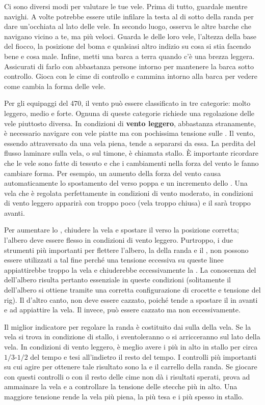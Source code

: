 Ci sono diversi modi per valutare le tue vele. Prima di tutto, guardale mentre
navighi. A volte potrebbe essere utile infilare la testa al di sotto della randa
per dare un'occhiata al lato \leeward delle vele. In secondo luogo, osserva le
altre barche che navigano vicino a te, ma più veloci. Guarda le \leeches delle
loro vele, l'altezza della base del fiocco, la posizione del boma e qualsiasi
altro indizio su cosa si stia facendo bene e cosa male. Infine, metti una barca
a terra quando c'è una brezza leggera. Assicurati di farlo con abbastanza
persone intorno per mantenere la barca sotto controllo. Gioca con le cime di
controllo e cammina intorno alla barca per vedere come cambia la forma delle
vele.

Per gli equipaggi del 470, il vento può essere classificato in tre categorie:
molto leggero, medio e forte. Ognuna di queste categorie richiede una
regolazione delle vele piuttosto diversa. In condizioni di \textbf{vento
      leggero}, abbastanza stranamente, è necessario navigare con vele piatte ma con
pochissima tensione sulle \sheets. Il vento, essendo attraversato da una vela
piena, tende a separarsi da essa. La perdita del flusso laminare sulla vela, o
sul timone, è chiamata stallo. È importante ricordare che le vele sono fatte di
tessuto e che i cambiamenti nella forza del vento le fanno cambiare forma. Per
esempio, un aumento della forza del vento causa automaticamente lo spostamento
del \draft verso poppa e un incremento dello \twist. Una vela che è regolata
perfettamente in condizioni di vento moderato, in condizioni di vento leggero
apparirà con troppo poco \twist (vela troppo chiusa) e il \draft sarà troppo
avanti.

Per aumentare lo \twist, chiudere la vela e spostare il \draft verso la
posizione corretta; l'albero deve essere flesso in condizioni di vento leggero.
Purtroppo, i due strumenti più importanti per flettere l'albero, la \sheet della
randa e il \vang, non possono essere utilizzati a tal fine perché una tensione
eccessiva su queste linee appiattirebbe troppo la vela e chiuderebbe
eccessivamente la \leech. La conoscenza del \prebend dell'albero risulta
pertanto essenziale in queste condizioni (solitamente il \prebend dell'albero si
ottiene tramite una corretta configurazione di crocette e tensione del rig). Il
\cunningham d'altro canto, non deve essere cazzato, poiché tende a spostare il
\draft in avanti e ad appiattire la vela. Il \outhaul invece, può essere cazzato
ma non eccessivamente.

Il miglior indicatore per regolare la randa è costituito dai \telltales sulla
\leech della vela. Se la vela si trova in condizione di stallo, i \telltales
sventoleranno o si arricceranno sul lato \leeward della vela. In condizioni di
vento leggero, è meglio avere i \telltales più in alto in stallo per circa
$1/3$-$1/2$ del tempo e tesi all'indietro il resto del tempo. I controlli più
importanti su cui agire per ottenere tale risultato sono la \sheet e il carrello
della randa. Se giocare con questi controlli o con il resto delle cime non dà i
risultati sperati, prova ad ammainare la vela e a controllare la tensione delle
stecche più in alto. Una maggiore tensione rende la vela più piena, la \leech
più tesa e i \telltales più spesso in stallo.

